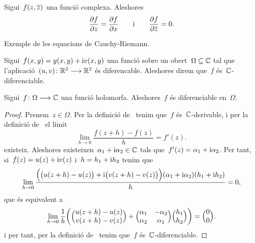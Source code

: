 \documentclass[../Apunts.tex]{subfiles}
\begin{document}
	\begin{observation}
		Sigui~\(f(z,\overline{z})\) una funció complexa. Aleshores
		\[\frac{\partial f}{\partial z}=\frac{\partial f}{\partial x}\qquad\text{i}\qquad\frac{\partial f}{\partial\overline{z}}=0.\]
	\end{observation}
	\begin{example}
		Exemple de les equacions de Cauchy-Riemann.
	\end{example}
	\begin{solution}
	\end{solution}
	\begin{definition}
		\label{def:C-diferenciable}
		Sigui~\(f(x,y)=y(x,y)+\mathrm{i} v(x,y)\) una funció sobre un obert~\(\Omega\subseteq\mathbb{C}\) tal que l'aplicació~\((u,v)\colon\mathbb{R}^{2}\longrightarrow\mathbb{R}^{2}\) és diferencable. Aleshores direm que~\(f\) és~\(\mathbb{C}\)-diferenciable.
	\end{definition}
	\begin{proposition}
		\label{prop:les funcions holomorfes són funcions diferenciables}
		Sigui~\(f\colon\Omega\longrightarrow\mathbb{C}\) una funció holomorfa. Aleshores~\(f\) és diferenciable en~\(\Omega\).
	\end{proposition}
	\begin{proof}
		Prenem~\(z\in\Omega\). Per la definició de~ tenim que~\(f\) és~\(\mathbb{C}\)-derivable, i per la definició de~ el límit
		\begin{equation*}
			\lim_{h\to0}\frac{f(z+h)-f(z)}{h} = f'(z).
		\end{equation*}
		existeix. Aleshores existeixen~\(\alpha_{1}+\mathrm{i}\alpha_{2}\in\mathbb{C}\) tals que~\(f'(z)=\alpha_{1}+\mathrm{i}\alpha_{2}\). Per tant, si~\(f(z)=u(z)+\mathrm{i} v(z)\) i~\(h=h_{1}+\mathrm{i} h_{2}\) tenim que
		\begin{equation*}
			\lim_{h\to0}\frac{\Bigl(\bigl(u(z+h)-u(z)\bigr)+\mathrm{i}\bigl(v(z+h)-v(z)\bigr)\Bigr)(\alpha_{1}+\mathrm{i}\alpha_{2})(h_{1}+\mathrm{i} h_{2})}{h} = 0,
		\end{equation*}
		que és equivalent a
		\begin{equation*}
		\lim_{h\to0}\frac{1}{h}\biggl(\Bigl(\begin{matrix} u(z+h)-u(z) \\ v(z+h)-v(z) \end{matrix}\Bigr) + \Bigl(\begin{matrix} \alpha_{1} & -\alpha_{2} \\ \alpha_{2} & \alpha_{1}\end{matrix}\Bigr)\Bigl(\begin{matrix} h_{1} \\ h_{2} \end{matrix}\Bigr)\biggr) = \Bigl(\begin{matrix} 0 \\ 0 \end{matrix}\Bigr).
		\end{equation*}
		i per tant, per la definició de~ tenim que~\(f\) és~\(\mathbb{C}\)-diferenciable.
	\end{proof}
\end{document}
